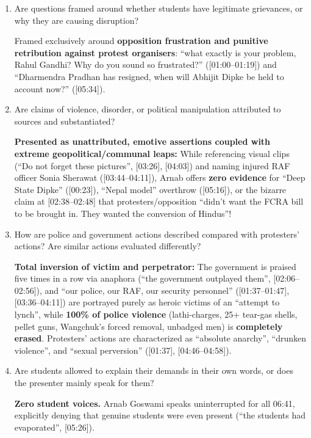 \documentclass[10pt,a4paper]{article}
\begin{document}
{\begin{enumerate}[leftmargin=1.5em, itemsep=6pt, topsep=4pt]
  \textbf{Zero responsibility is attributed to the NTA, Dharmendra Pradhan, or the government.} Instead, blame is placed entirely on Rahul Gandhi, Arvind Kejriwal, Yogendra Yadav ([00:33--00:51]), ``Deep State Dipke'' ([00:23], [04:19--05:43]), and ``questionable'' Sonam Wangchuk ([00:33]).
  \item Are questions framed around whether students have legitimate grievances, or why they are causing disruption?\par\smallskip
  Framed exclusively around \textbf{opposition frustration and punitive retribution against protest organisers}: ``what exactly is your problem, Rahul Gandhi? Why do you sound so frustrated?'' ([01:00--01:19]) and ``Dharmendra Pradhan has resigned, when will Abhijit Dipke be held to account now?'' ([05:34]).
  \item Are claims of violence, disorder, or political manipulation attributed to sources and substantiated?\par\smallskip
  \textbf{Presented as unattributed, emotive assertions coupled with extreme geopolitical/communal leaps:} While referencing visual clips (``Do not forget these pictures'', [03:26], [04:03]) and naming injured RAF officer Sonia Sherawat ([03:44--04:11]), Arnab offers \textbf{zero evidence} for ``Deep State Dipke'' ([00:23]), ``Nepal model'' overthrow ([05:16]), or the bizarre claim at [02:38--02:48] that protesters/opposition ``didn't want the FCRA bill to be brought in. They wanted the conversion of Hindus''!
  \item How are police and government actions described compared with protesters' actions? Are similar actions evaluated differently?\par\smallskip
  \textbf{Total inversion of victim and perpetrator:} The government is praised five times in a row via anaphora (``the government outplayed them'', [02:06--02:56]), and ``our police, our RAF, our security personnel'' ([01:37--01:47], [03:36--04:11]) are portrayed purely as heroic victims of an ``attempt to lynch'', while \textbf{100\% of police violence} (lathi-charges, 25+ tear-gas shells, pellet guns, Wangchuk's forced removal, unbadged men) is \textbf{completely erased}. Protesters' actions are characterized as ``absolute anarchy'', ``drunken violence'', and ``sexual perversion'' ([01:37], [04:46--04:58]).
  \item Are students allowed to explain their demands in their own words, or does the presenter mainly speak for them?\par\smallskip
  \textbf{Zero student voices.} Arnab Goswami speaks uninterrupted for all 06:41, explicitly denying that genuine students were even present (``the students had evaporated'', [05:26]).

\end{enumerate}}
\end{document}
